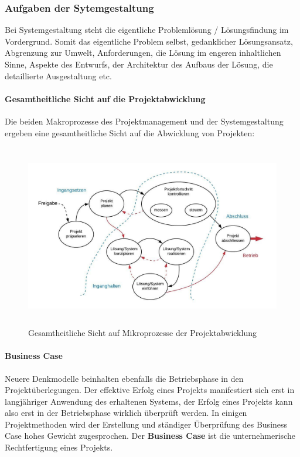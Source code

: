 \documentclass[a4paper]{article}
\begin{document}
			\subsubsection{Aufgaben der Sytemgestaltung}
			
			Bei Systemgestaltung steht die eigentliche Problemlösung / Lösungsfindung im Vordergrund.
			Somit das eigentliche Problem selbst, gedanklicher Lösungsansatz, Abgrenzung zur Umwelt, Anforderungen, die Lösung im engeren inhaltlichen Sinne, Aspekte des Entwurfs, der Architektur des Aufbaus der Lösung, die detaillierte Ausgestaltung etc.
			
\newpage
			
			\paragraph{Gesamtheitliche Sicht auf die Projektabwicklung}
			
			Die beiden Makroprozesse des Projektmanagement und der Systemgestaltung ergeben eine gesamtheitliche Sicht auf die Abwicklung von Projekten:
		
			\begin{figure}[!htb]
				\centering
				\includegraphics[keepaspectratio, height=8cm]{img/pm/project_view.jpeg}
				\caption{Gesamtheitliche Sicht auf Mikroprozesse der Projektabwicklung}
				\label{fig:pm_projectview}
			\end{figure}
		
			\paragraph{Business Case}
			
			Neuere Denkmodelle beinhalten ebenfalls die Betriebsphase in den Projektüberlegungen.
			Der effektive Erfolg eines Projekts manifestiert sich erst in langjähriger Anwendung des erhaltenen Systems, der Erfolg eines Projekts kann also erst in der Betriebsphase wirklich überprüft werden.
			In einigen Projektmethoden wird der Erstellung und ständiger Überprüfung des Business Case hohes Gewicht zugesprochen.
			Der \textbf{Business Case} ist die unternehmerische Rechtfertigung eines Projekts.
			
\end{document}
